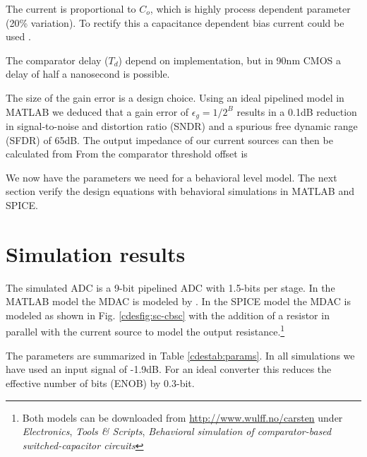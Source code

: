 


The current is proportional
to $C_o$, which is highly process dependent parameter (20\%
variation). To rectify this a capacitance dependent bias current could
be used \cite{andersen05}.

The comparator delay ($T_d$) depend on implementation, but in 90nm CMOS
a delay of half a nanosecond is possible.

The size of the gain error is a design choice. Using an ideal
pipelined model in MATLAB we deduced that a gain
error of $\epsilon_g = 1/2^B$ results in a 0.1dB reduction in
signal-to-noise and distortion ratio (SNDR) and a spurious free
dynamic range (SFDR) of 65dB.
The output impedance of our current
sources can then  be calculated from 
From  the comparator threshold offset is 

We now have the parameters we need for a behavioral level
model. The next section verify the design equations with behavioral
simulations in MATLAB and SPICE. 

\section{Simulation results}\label{cdessc:sims}
The simulated ADC is a 9-bit pipelined ADC with 1.5-bits per
stage. In the MATLAB model the MDAC is modeled by . In
the SPICE model the MDAC is modeled as shown in
Fig. \ref{cdesfig:sc-cbsc} with the addition of a resistor in parallel
with the current source to model the output resistance.\footnote{Both
  models can be downloaded from \url{http://www.wulff.no/carsten}
  under \textit{Electronics}, \textit{Tools \& Scripts}, \textit{Behavioral simulation of
    comparator-based switched-capacitor circuits}}



The parameters are summarized in Table
\ref{cdestab:params}. 
In all simulations we have used an input signal of -1.9dB. 
For an
ideal converter this reduces the effective number of bits (ENOB) by
0.3-bit. 

